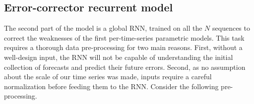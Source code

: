\documentclass{article} %
\newcommand{\ts}{y}
\newcommand{\fullts}{{\bf \ts}}
\newcommand{\tspred}{\hat{\ts}}
\newcommand{\lag}{h}
\newcommand{\remainder}{r}
\begin{document}



\subsection{Error-corrector recurrent model}

The second part of the model is a global RNN, trained on all the $N$ sequences to correct the weaknesses of the first per-time-series parametric models. This task requires a thorough data pre-processing for two main reasons. First, without a well-design input, the RNN will not be capable of understanding the initial collection of forecasts and predict their future errors. Second, as no assumption about the scale of our time series was made, inputs require a careful normalization before feeding them to the RNN.
Consider the following pre-processing. 
\end{document}
